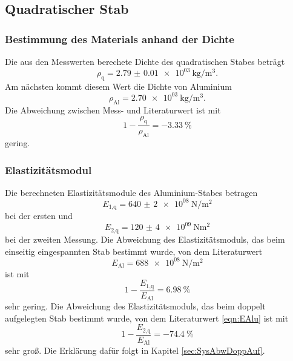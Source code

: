 \subsection{Quadratischer Stab}

\subsubsection{Bestimmung des Materials anhand der Dichte}

Die aus den Messwerten berechete Dichte des quadratischen Stabes beträgt
\begin{equation}
  \rho_\text{q} = \SI{2.79(1)e03}{\kilo\gram\per\cubic\meter}.
\end{equation}
Am nächsten kommt diesem Wert die Dichte von Aluminium \cite{Metallwerte}
\begin{equation}
  \rho_\text{Al} = \SI{2.70e03}{\kilo\gram\per\cubic\meter}.
\end{equation}
Die Abweichung zwischen Mess- und Literaturwert ist mit
\begin{equation}
  1-\frac{\rho_\text{q}}{\rho_\text{Al}} = -\SI{3.33}{\percent}
\end{equation}
gering.

\subsubsection{Elastizitätsmodul}

Die berechneten Elastizitätsmodule des Aluminium-Stabes betragen
\begin{equation}
  E_\text{1,q} = \SI{640(2)e08}{\newton\per\meter\squared}
\end{equation}
bei der ersten und
\begin{equation}
  E_\text{2,q} = \SI{120(4)e09}{\newton\meter\squared}
\end{equation}
bei der zweiten Messung.
Die Abweichung des Elastizitätsmoduls, das beim einseitig eingespannten Stab
bestimmt wurde, von dem Literaturwert \cite{Metallwerte}
\begin{equation}
  E_\text{Al} = \SI{688e08}{\newton\per\meter\squared}
  \label{eqn:EAlu}
\end{equation}
ist mit
\begin{equation}
  1 - \frac{E_\text{1,q}}{E_\text{Al}} = \SI{6.98}{\percent}
\end{equation}
sehr gering.
Die Abweichung des Elastizitätsmoduls, das beim doppelt aufgelegten Stab
bestimmt wurde, von dem Literaturwert \eqref{eqn:EAlu} ist mit
\begin{equation}
  1 - \frac{E_\text{2,q}}{E_\text{Al}} = -\SI{74.4}{\percent}
  \label{eqn:AbwE2}
\end{equation}
sehr groß. Die Erklärung dafür folgt in Kapitel \ref{sec:SysAbwDoppAuf}.

